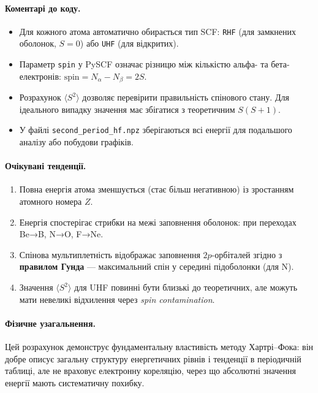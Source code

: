 \paragraph{Коментарі до коду.}
\begin{itemize}
    \item Для кожного атома автоматично обирається тип SCF: \texttt{RHF} (для замкнених оболонок, $S=0$) або \texttt{UHF} (для відкритих).
    \item Параметр \texttt{spin} у PySCF означає різницю між кількістю альфа- та бета-електронів:
          \(\text{spin} = N_\alpha - N_\beta = 2S.\)
    \item Розрахунок \(\langle S^2 \rangle\) дозволяє перевірити правильність спінового стану. Для ідеального випадку значення має збігатися з теоретичним \(S(S+1)\).
    \item У файлі \texttt{second\_period\_hf.npz} зберігаються всі енергії для подальшого аналізу або побудови графіків.
\end{itemize}

\paragraph{Очікувані тенденції.}
\begin{enumerate}
    \item Повна енергія атома зменшується (стає більш негативною) із зростанням атомного номера $Z$.
    \item Енергія спостерігає стрибки на межі заповнення оболонок: при переходах Be→B, N→O, F→Ne.
    \item Спінова мультиплетність відображає заповнення $2p$-орбіталей згідно з \textbf{правилом Гунда} --- максимальний спін у середині підоболонки (для N).
    \item Значення \(\langle S^2 \rangle\) для UHF повинні бути близькі до теоретичних, але можуть мати невеликі відхилення через \textit{spin contamination}.
\end{enumerate}

\paragraph{Фізичне узагальнення.}
Цей розрахунок демонструє фундаментальну властивість методу Хартрі–Фока:
він добре описує загальну структуру енергетичних рівнів і тенденції в періодичній таблиці, але не враховує електронну кореляцію, через що абсолютні значення енергії мають систематичну похибку.

